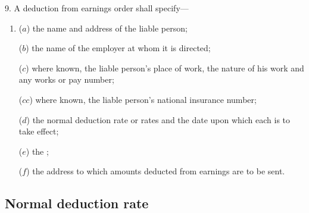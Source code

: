 \documentclass[12pt,a4paper]{article}
\begin{document}
9.  A deduction from earnings order shall specify—
\begin{enumerate}\item[]
($a$) the name and address of the liable person;

($b$) the name of the employer at whom it is directed;

($c$) where known, the liable person’s place of work, the nature of his work and any works or pay number;

($cc$) where known, the liable person’s national insurance number;

%

($d$) the normal deduction rate or rates and the date upon which each is to take effect;

($e$) the 
;  %

($f$) the address to which amounts deducted from earnings are to be sent.
\end{enumerate}


\subsection[10. Normal deduction rate]{Normal deduction rate}
\end{document}
